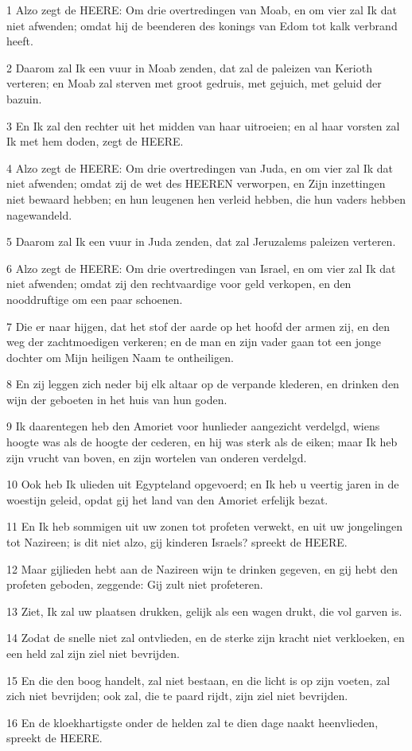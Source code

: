 \par 1 Alzo zegt de HEERE: Om drie overtredingen van Moab, en om vier zal Ik dat niet afwenden; omdat hij de beenderen des konings van Edom tot kalk verbrand heeft.
\par 2 Daarom zal Ik een vuur in Moab zenden, dat zal de paleizen van Kerioth verteren; en Moab zal sterven met groot gedruis, met gejuich, met geluid der bazuin.
\par 3 En Ik zal den rechter uit het midden van haar uitroeien; en al haar vorsten zal Ik met hem doden, zegt de HEERE.
\par 4 Alzo zegt de HEERE: Om drie overtredingen van Juda, en om vier zal Ik dat niet afwenden; omdat zij de wet des HEEREN verworpen, en Zijn inzettingen niet bewaard hebben; en hun leugenen hen verleid hebben, die hun vaders hebben nagewandeld.
\par 5 Daarom zal Ik een vuur in Juda zenden, dat zal Jeruzalems paleizen verteren.
\par 6 Alzo zegt de HEERE: Om drie overtredingen van Israel, en om vier zal Ik dat niet afwenden; omdat zij den rechtvaardige voor geld verkopen, en den nooddruftige om een paar schoenen.
\par 7 Die er naar hijgen, dat het stof der aarde op het hoofd der armen zij, en den weg der zachtmoedigen verkeren; en de man en zijn vader gaan tot een jonge dochter om Mijn heiligen Naam te ontheiligen.
\par 8 En zij leggen zich neder bij elk altaar op de verpande klederen, en drinken den wijn der geboeten in het huis van hun goden.
\par 9 Ik daarentegen heb den Amoriet voor hunlieder aangezicht verdelgd, wiens hoogte was als de hoogte der cederen, en hij was sterk als de eiken; maar Ik heb zijn vrucht van boven, en zijn wortelen van onderen verdelgd.
\par 10 Ook heb Ik ulieden uit Egypteland opgevoerd; en Ik heb u veertig jaren in de woestijn geleid, opdat gij het land van den Amoriet erfelijk bezat.
\par 11 En Ik heb sommigen uit uw zonen tot profeten verwekt, en uit uw jongelingen tot Nazireen; is dit niet alzo, gij kinderen Israels? spreekt de HEERE.
\par 12 Maar gijlieden hebt aan de Nazireen wijn te drinken gegeven, en gij hebt den profeten geboden, zeggende: Gij zult niet profeteren.
\par 13 Ziet, Ik zal uw plaatsen drukken, gelijk als een wagen drukt, die vol garven is.
\par 14 Zodat de snelle niet zal ontvlieden, en de sterke zijn kracht niet verkloeken, en een held zal zijn ziel niet bevrijden.
\par 15 En die den boog handelt, zal niet bestaan, en die licht is op zijn voeten, zal zich niet bevrijden; ook zal, die te paard rijdt, zijn ziel niet bevrijden.
\par 16 En de kloekhartigste onder de helden zal te dien dage naakt heenvlieden, spreekt de HEERE.

